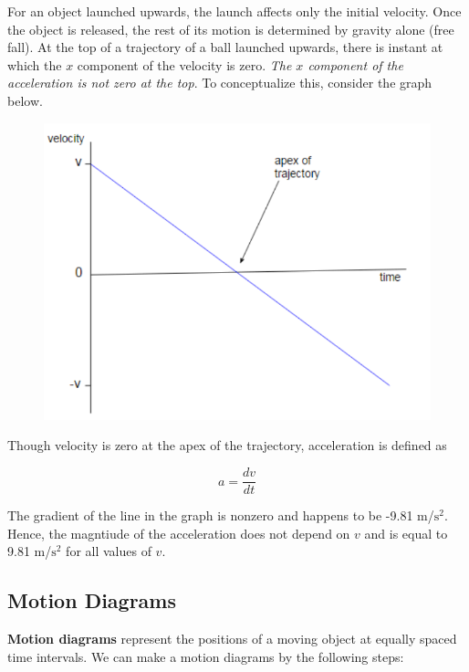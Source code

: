         For an object launched upwards, the launch affects only the initial velocity. Once the object is released, the rest of its motion is determined by gravity alone (free fall). At the top of a trajectory of a ball
        launched upwards, there is instant at which the $x$ component of the velocity is zero. \textit{The $x$ component of the acceleration is not zero at the top}. To conceptualize this, consider the graph below.

        \begin{figure}[hbt!]
            \centering
            \includegraphics[scale=0.6]{Resources/Nonzero_Acceleration_Trajectory}
        \end{figure}

        Though velocity is zero at the apex of the trajectory, acceleration is defined as

        \[
            a = \frac{dv}{dt}
        \]

        The gradient of the line in the graph is nonzero and happens to be -9.81 m/$\text{s}^2$. Hence, the magntiude of the acceleration does not depend on $v$ and is equal to 9.81 m/$\text{s}^2$ for all values of $v$.



    \subsection{Motion Diagrams}
        \textbf{Motion diagrams} represent the positions of a moving object at equally spaced time intervals. We can make a motion diagrams by the following steps: \\

